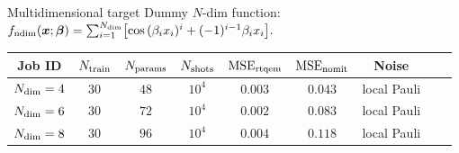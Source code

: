 \documentclass[8pt, xcolor={svgnames}, hyperref={linkcolor=black}, aspectratio=169]{beamer}
\begin{document}
\begin{frame}{Multidimensional target}
Dummy $N$-dim function: $ f_{\rm ndim}(\bm{x}; \bm{\beta}) = \sum_{i=1}^{N_{\rm dim}} \bigl[ \cos{(\beta_i x_i)^{i}} + 
(-1)^{i-1} \beta_i x_i \bigr]. $
\begin{center}
\footnotesize
\begin{tabular}{ccccccccc}
\hline \hline 
\rule{0pt}{2.5ex}
\textbf{Job ID} & $N_{\rm train}$ & $N_{\rm params}$ & $N_{\rm shots}$ 
& $\text{MSE}_{\rm rtqem}$ &  $\text{MSE}_{\rm nomit}$ & Noise \\
\hline
$N_{\rm dim}=4$ & $30$ & $48$ & $10^{4}$ &  $0.003$ & $0.043$ & local Pauli \\
$N_{\rm dim}=6$ & $30$ & $72$ & $10^{4}$ &  $0.002$ & $0.083$ & local Pauli \\
$N_{\rm dim}=8$ & $30$ & $96$ & $10^{4}$ &  $0.004$ & $0.118$ & local Pauli \\
\hline \hline 
\end{tabular}
\end{center}


\end{frame}
\end{document}
